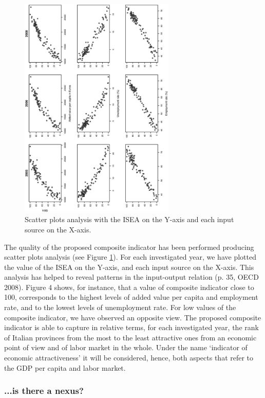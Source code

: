 \documentclass[10pt]{article}
\theoremstyle{definition}
\theoremstyle{plain}
\begin{document}
\begin{figure}[htbp]
\centering
	\includegraphics[width=0.66\textwidth, angle=270]{sensitivity.eps}
\caption{Scatter plots analysis with the ISEA on the Y-axis and each input source on the X-axis.}
	\label{fig4}
\end{figure}

The quality of the proposed composite indicator has been performed producing scatter plots analysis (see Figure \ref{fig4}). For each investigated year, we have plotted the value of the ISEA on the Y-axis, and each input source on the X-axis. This analysis has helped to reveal patterns in the input-output relation (p. 35, OECD 2008). Figure 4 shows, for instance, that a value of composite indicator close to 100, corresponds to the highest levels of added value per capita and employment rate, and to the lowest levels of unemployment rate. For low values of the composite indicator, we have observed an opposite view. The proposed composite indicator is able to capture in relative terms, for each investigated year, the rank of Italian provinces from the most to the least attractive ones from an economic point of view and of labor market in the whole. Under the name `indicator of economic attractiveness' it will be considered, hence, both aspects that refer to the GDP per capita and labor market.


\subsubsection{...is there a nexus? \label{nexus}}
\end{document}
